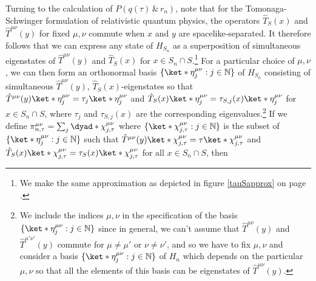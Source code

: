 \documentclass[12pt]{report}
\begin{document}
Turning to the calculation of $P(q(\tau)\, \& \, r_n)$, note that for the Tomonaga-Schwinger formulation of relativistic quantum physics, the operators $\hat{T}_S(x)$ and $\hat{T}^{\mu\nu}(y)$ for fixed $\mu,\nu$ commute when $x$ and $y$ are spacelike-separated. It therefore follows that we can express any state of $H_{S_n}$ as a superposition of simultaneous eigenstates of $\hat{T}^{\mu\nu}(y)$ and $\hat{T}_S(x)$ for $x\in S_n\cap S$.\footnote{We make the same approximation as depicted in figure \ref{tauSapprox} on page \pageref{tauSapprox}.}  For a particular choice of $\mu,\nu$, we can then form an orthonormal basis $\{\ket*{\eta_j^{\mu\nu}}:j\in\mathbb{N}\}$ of %
%
 $H_{S_n}$ consisting of simultaneous $\hat{T}^{\mu\nu}(y)$, $\hat{T}_S(x)$-eigenstates so that $\hat{T}^{\mu\nu}(y)\ket*{\eta_j^{\mu\nu}}=\tau_{j}\ket*{\eta_j^{\mu\nu}}$ and $\hat{T}_{S}(x)\ket*{\eta_j^{\mu\nu}}=\tau_{S,j}(x)\ket*{\eta_j^{\mu\nu}}$ for $x\in S_n\cap S$, where $\tau_{j}$ and $\tau_{S,j}(x)$ are the corresponding eigenvalues.\footnote{We include the indices   $\mu,\nu$ in the specification of the basis $\{\ket*{\eta_j^{\mu\nu}}:j\in\mathbb{N}\}$ since in general, we can't assume that $\hat{T}^{\mu\nu}(y)$ and $\hat{T}^{\mu'\nu'}(y)$ commute for $\mu\neq \mu'$ or $\nu\neq \nu'$, and so we have to fix $\mu,\nu$ and consider a basis $\{\ket*{\eta_j^{\mu\nu}}:j\in\mathbb{N}\}$ of $H_n$ which depends on the particular $\mu,\nu$ so that all the elements of this basis can be eigenstates of  $\hat{T}^{\mu\nu}(y)$.} If we define %
   $\pi_{n,\tau}^{\mu\nu}=\sum_j\dyad*{\chi_{j,\tau}^{\mu\nu}}$ where $\{\ket*{\chi_{j,\tau}^{\mu\nu}}:j\in\mathbb{N}\}$ %
  is the subset of $\{\ket*{\eta_j^{\mu\nu}}:j\in\mathbb{N}\}$ such that $\hat{T}^{\mu\nu}(y)\ket*{\chi_{j,\tau}^{\mu\nu}}=\tau\ket*{\chi_{j,\tau}^{\mu\nu}}$ and $\hat{T}_S(x)\ket*{\chi_{j,\tau}^{\mu\nu}}=\tau_S(x)\ket*{\chi_{j,\tau}^{\mu\nu}}$ for all $x\in S_n\cap S$, then 
\end{document}
